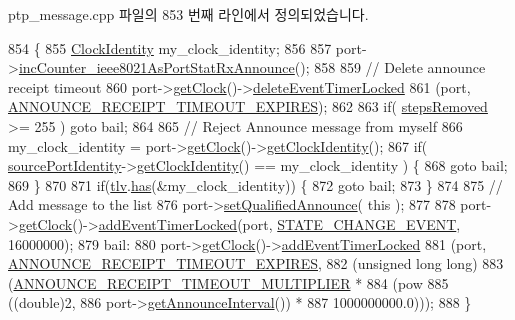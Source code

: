 ptp\+\_\+message.\+cpp 파일의 853 번째 라인에서 정의되었습니다.


\begin{DoxyCode}
854 \{
855     \hyperlink{class_clock_identity}{ClockIdentity} my\_clock\_identity;
856 
857     port->\hyperlink{class_common_port_ad2bd29a405395048ac98c1ad5f3b4d0f}{incCounter\_ieee8021AsPortStatRxAnnounce}();
858 
859     \textcolor{comment}{// Delete announce receipt timeout}
860     port->\hyperlink{class_common_port_ab8e59ecfb51ec14e166bc8bfc872b1ef}{getClock}()->\hyperlink{class_i_e_e_e1588_clock_ab3079a65b0509eeb40c2828fa6a7834a}{deleteEventTimerLocked}
861         (port, \hyperlink{ieee1588_8hpp_a5667b805d857c6d28f83f6038a0272d3a7060ecc9be507f5c8828eedf6a163c8b}{ANNOUNCE\_RECEIPT\_TIMEOUT\_EXPIRES});
862 
863     \textcolor{keywordflow}{if}( \hyperlink{class_p_t_p_message_announce_ab24df4cccbede4b07586878ef0d47395}{stepsRemoved} >= 255 ) \textcolor{keywordflow}{goto} bail;
864 
865     \textcolor{comment}{// Reject Announce message from myself}
866     my\_clock\_identity = port->\hyperlink{class_common_port_ab8e59ecfb51ec14e166bc8bfc872b1ef}{getClock}()->\hyperlink{class_i_e_e_e1588_clock_a56fd598a1dfd3bfe0658272544921162}{getClockIdentity}();
867     \textcolor{keywordflow}{if}( \hyperlink{class_p_t_p_message_common_a415b5544bdd3ea41dae460fa1af900d9}{sourcePortIdentity}->\hyperlink{class_port_identity_a6cfd51581c2881ac89d7ed113d798a87}{getClockIdentity}() == my\_clock\_identity ) \{
868         \textcolor{keywordflow}{goto} bail;
869     \}
870 
871     \textcolor{keywordflow}{if}(\hyperlink{class_p_t_p_message_announce_ac7b185260086ad357ff7a9c29f468936}{tlv}.\hyperlink{class_path_trace_t_l_v_ade002bca1042a2d70d682b0cf69e8717}{has}(&my\_clock\_identity)) \{
872         \textcolor{keywordflow}{goto} bail;
873     \}
874 
875     \textcolor{comment}{// Add message to the list}
876     port->\hyperlink{class_common_port_a6d8b30d648cbd6048a083e64bf3cd0dd}{setQualifiedAnnounce}( \textcolor{keyword}{this} );
877 
878     port->\hyperlink{class_common_port_ab8e59ecfb51ec14e166bc8bfc872b1ef}{getClock}()->\hyperlink{class_i_e_e_e1588_clock_a4747f09108bd78ecd68d58dad4358d77}{addEventTimerLocked}(port, 
      \hyperlink{ieee1588_8hpp_a5667b805d857c6d28f83f6038a0272d3a39c91cfde69942bacf91a19587379be1}{STATE\_CHANGE\_EVENT}, 16000000);
879  bail:
880     port->\hyperlink{class_common_port_ab8e59ecfb51ec14e166bc8bfc872b1ef}{getClock}()->\hyperlink{class_i_e_e_e1588_clock_a4747f09108bd78ecd68d58dad4358d77}{addEventTimerLocked}
881         (port, \hyperlink{ieee1588_8hpp_a5667b805d857c6d28f83f6038a0272d3a7060ecc9be507f5c8828eedf6a163c8b}{ANNOUNCE\_RECEIPT\_TIMEOUT\_EXPIRES},
882          (\textcolor{keywordtype}{unsigned} \textcolor{keywordtype}{long} \textcolor{keywordtype}{long})
883          (\hyperlink{common__port_8hpp_aeda88e4edf1cca8ee8e367150c8004b5}{ANNOUNCE\_RECEIPT\_TIMEOUT\_MULTIPLIER} *
884           (pow
885            ((\textcolor{keywordtype}{double})2,
886             port->\hyperlink{class_common_port_a7aa1a5fddf7129f600c97c018087b7b8}{getAnnounceInterval}()) *
887            1000000000.0)));
888 \}
\end{DoxyCode}


